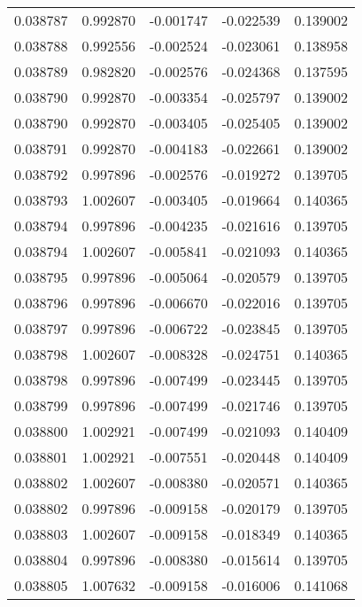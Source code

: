 \begin{tabular}{lrrrr}
0.038787    &  0.992870 & -0.001747 & -0.022539 &             0.139002 \\
0.038788    &  0.992556 & -0.002524 & -0.023061 &             0.138958 \\
0.038789    &  0.982820 & -0.002576 & -0.024368 &             0.137595 \\
0.038790    &  0.992870 & -0.003354 & -0.025797 &             0.139002 \\
0.038790    &  0.992870 & -0.003405 & -0.025405 &             0.139002 \\
0.038791    &  0.992870 & -0.004183 & -0.022661 &             0.139002 \\
0.038792    &  0.997896 & -0.002576 & -0.019272 &             0.139705 \\
0.038793    &  1.002607 & -0.003405 & -0.019664 &             0.140365 \\
0.038794    &  0.997896 & -0.004235 & -0.021616 &             0.139705 \\
0.038794    &  1.002607 & -0.005841 & -0.021093 &             0.140365 \\
0.038795    &  0.997896 & -0.005064 & -0.020579 &             0.139705 \\
0.038796    &  0.997896 & -0.006670 & -0.022016 &             0.139705 \\
0.038797    &  0.997896 & -0.006722 & -0.023845 &             0.139705 \\
0.038798    &  1.002607 & -0.008328 & -0.024751 &             0.140365 \\
0.038798    &  0.997896 & -0.007499 & -0.023445 &             0.139705 \\
0.038799    &  0.997896 & -0.007499 & -0.021746 &             0.139705 \\
0.038800    &  1.002921 & -0.007499 & -0.021093 &             0.140409 \\
0.038801    &  1.002921 & -0.007551 & -0.020448 &             0.140409 \\
0.038802    &  1.002607 & -0.008380 & -0.020571 &             0.140365 \\
0.038802    &  0.997896 & -0.009158 & -0.020179 &             0.139705 \\
0.038803    &  1.002607 & -0.009158 & -0.018349 &             0.140365 \\
0.038804    &  0.997896 & -0.008380 & -0.015614 &             0.139705 \\
0.038805    &  1.007632 & -0.009158 & -0.016006 &             0.141068 \\

\end{tabular}
